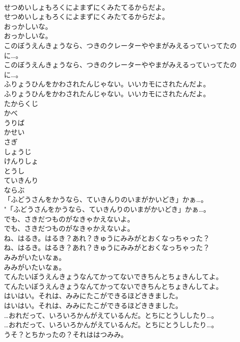 \documentclass[8pt]{extreport}
\begin{document}
\begin{CJK}{UTF8}{min}
\\	せつめいしょもろくによまずにくみたてるからだよ。	
\\	せつめいしょもろくによまずにくみたてるからだよ。 
\\	おっかしいな。	
\\	おっかしいな。 
\\	このぼうえんきょうなら、つきのクレーターややまがみえるっていってたのに…。	
\\	このぼうえんきょうなら、つきのクレーターややまがみえるっていってたのに…。 
\\	ふりょうひんをかわされたんじゃない。いいカモにされたんだよ。	
\\	ふりょうひんをかわされたんじゃない。いいカモにされたんだよ。 
\\	たからくじ
\\	かべ
\\	うりば
\\	かせい
\\	さぎ
\\	しょうじ
\\	けんりしょ
\\	とうし
\\	ていきんり
\\	ならぶ
\\	「ふどうさんをかうなら、ていきんりのいまがかいどき」かぁ…。	
\\	"「ふどうさんをかうなら、ていきんりのいまがかいどき」かぁ…。 
\\	でも、さきだつものがなきゃかえないよ。	
\\	でも、さきだつものがなきゃかえないよ。 
\\	ね、はるき。はるき？あれ？きゅうにみみがとおくなっちゃった？	
\\	ね、はるき。はるき？あれ？きゅうにみみがとおくなっちゃった？ 
\\	みみがいたいなぁ。	
\\	みみがいたいなぁ。 
\\	てんたいぼうえんきょうなんてかってないできちんとちょきんしてよ。	
\\	てんたいぼうえんきょうなんてかってないできちんとちょきんしてよ。 
\\	はいはい。それは、みみにたこができるほどききました。	
\\	はいはい。それは、みみにたこができるほどききました。 
\\	…おれだって、いろいろかんがえているんだ。とちにとうししたり…。	
\\	…おれだって、いろいろかんがえているんだ。とちにとうししたり…。 
\\	うそ？とちかったの？それははつみみ。	

\end{CJK}
\end{document}
